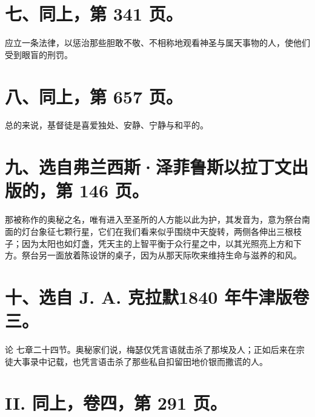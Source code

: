 \section{七、同上，第 341 页。}

应立一条法律，以惩治那些胆敢不敬、不相称地观看神圣与属天事物的人，使他们受到眼盲的刑罚。\par


\section{八、同上，第 657 页。}

总的来说，基督徒是喜爱独处、安静、宁静与和平的。\par


\section{九、选自弗兰西斯·泽菲鲁斯以拉丁文出版的，第 146 页。}

那被称作的奥秘之名，唯有进入至圣所的人方能以此为护，其发音为，意为祭台南面的灯台象征七颗行星，它们在我们看来似乎围绕中天旋转，两侧各伸出三根枝子；因为太阳也如灯盏，凭天主的上智平衡于众行星之中，以其光照亮上方和下方。祭台另一面放着陈设饼的桌子，因为从那天际吹来维持生命与滋养的和风。\par


\section{十、选自 J. A. 克拉默1840 年牛津版卷三。}

论  七章二十四节。奥秘家们说，梅瑟仅凭言语就击杀了那埃及人；正如后来在宗徒大事录中记载，也凭言语击杀了那些私自扣留田地价银而撒谎的人。\par


\section{II. 同上，卷四，第 291 页。}

